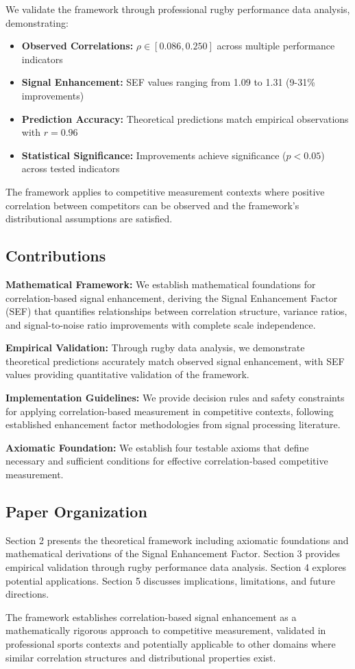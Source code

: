 We validate the framework through professional rugby performance data analysis, demonstrating:

\begin{itemize}
    \item \textbf{Observed Correlations:} $\rho \in [0.086, 0.250]$ across multiple performance indicators
    \item \textbf{Signal Enhancement:} SEF values ranging from 1.09 to 1.31 (9-31\% improvements)
    \item \textbf{Prediction Accuracy:} Theoretical predictions match empirical observations with $r = 0.96$
    \item \textbf{Statistical Significance:} Improvements achieve significance ($p < 0.05$) across tested indicators
\end{itemize}

The framework applies to competitive measurement contexts where positive correlation between competitors can be observed and the framework's distributional assumptions are satisfied.

\subsection{Contributions}

\textbf{Mathematical Framework:} We establish mathematical foundations for correlation-based signal enhancement, deriving the Signal Enhancement Factor (SEF) that quantifies relationships between correlation structure, variance ratios, and signal-to-noise ratio improvements with complete scale independence.

\textbf{Empirical Validation:} Through rugby data analysis, we demonstrate theoretical predictions accurately match observed signal enhancement, with SEF values providing quantitative validation of the framework.

\textbf{Implementation Guidelines:} We provide decision rules and safety constraints for applying correlation-based measurement in competitive contexts, following established enhancement factor methodologies from signal processing literature.

\textbf{Axiomatic Foundation:} We establish four testable axioms that define necessary and sufficient conditions for effective correlation-based competitive measurement.

\subsection{Paper Organization}

Section 2 presents the theoretical framework including axiomatic foundations and mathematical derivations of the Signal Enhancement Factor. Section 3 provides empirical validation through rugby performance data analysis. Section 4 explores potential applications. Section 5 discusses implications, limitations, and future directions.

The framework establishes correlation-based signal enhancement as a mathematically rigorous approach to competitive measurement, validated in professional sports contexts and potentially applicable to other domains where similar correlation structures and distributional properties exist.
